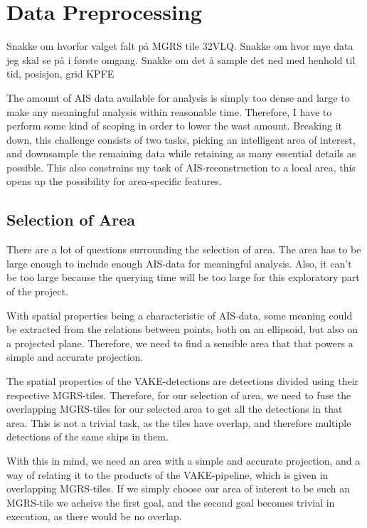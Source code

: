 \chapter[Data Preprocessing]{Data Preprocessing}
\begin{info}
	Snakke om hvorfor valget falt på MGRS tile 32VLQ. Snakke om hvor mye data jeg skal se på i første omgang. Snakke om det å sample det ned med henhold til tid, posisjon, grid KPFE
\end{info}

The amount of AIS data available for analysis is simply too dense and large to make any meaningful analysis within reasonable time. Therefore, I have to perform some kind of scoping in order to lower the wast amount. Breaking it down, this challenge consists of two tasks, picking an intelligent area of interest, and downsample the remaining data while retaining as many essential details as possible. This also constrains my task of AIS-reconstruction to a local area, this opens up the possibility for area-specific features.  


\section{Selection of Area}
There are a lot of questions surrounding the selection of area. The area has to  be large enough to include enough AIS-data for meaningful analysis. Also, it can't be too large because the querying time will be too large for this exploratory part of the project. 

With spatial properties being a characteristic of AIS-data, some meaning could be extracted from the relations between points, both on an ellipsoid, but also on a projected plane. Therefore, we need to find a sensible area that that powers a simple and accurate projection. 

The spatial properties of the VAKE-detections are detections divided using their respective MGRS-tiles. Therefore, for our selection of area, we need to fuse the overlapping MGRS-tiles for our selected area to get all the detections in that area. This is not a trivial task, as the tiles have overlap, and therefore multiple detections of the same ships in them. 

With this in mind, we need an area with a simple and accurate projection, and a way of relating it to the products of the VAKE-pipeline, which is given in overlapping MGRS-tiles. If we simply choose our area of interest to be such an MGRS-tile we acheive the first goal, and the second goal becomes trivial in execution, as there would be no overlap. 

